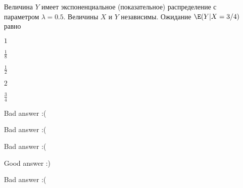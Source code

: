 
\begin{question}
Величина \(Y\) имеет экспоненциальное (показательное) распределение с
параметром \(\lambda=0.5\). Величины \(X\) и \(Y\) независимы. Ожидание
\(\E(Y|X=3/4)\) равно
\begin{answerlist}
  \item \(1\)
  \item \(\frac{1}{8}\)
  \item \(\frac{1}{2}\)
  \item \(2\)
  \item \(\frac{3}{4}\)
\end{answerlist}
\end{question}

\begin{solution}
\begin{answerlist}
  \item Bad answer :(
  \item Bad answer :(
  \item Bad answer :(
  \item Good answer :)
  \item Bad answer :(
\end{answerlist}
\end{solution}

